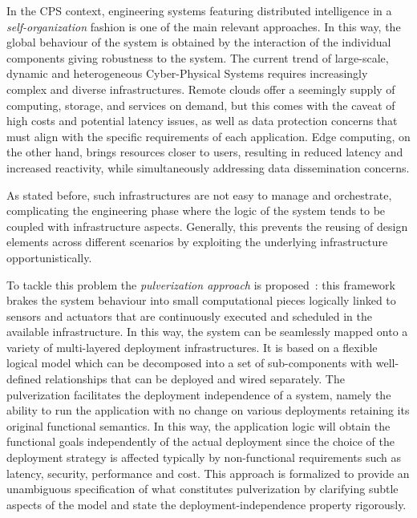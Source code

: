 In the CPS context, engineering systems featuring distributed intelligence in a \emph{self-organization} fashion is one of the main relevant
approaches. In this way, the global behaviour of the system is obtained by the interaction of the individual components giving robustness to the
system. The current trend of large-scale, dynamic and heterogeneous Cyber-Physical Systems requires increasingly complex and diverse
infrastructures. Remote clouds offer a seemingly supply of computing, storage, and services on demand, but this comes with the caveat of high
costs and potential latency issues, as well as data protection concerns that must align with the specific requirements of each application. Edge
computing, on the other hand, brings resources closer to users, resulting in reduced latency and increased reactivity, while simultaneously
addressing data dissemination concerns.

As stated before, such infrastructures are not easy to manage and orchestrate, complicating the engineering phase where the logic of the
system tends to be coupled with infrastructure aspects. Generally, this prevents the reusing of design elements across different scenarios by
exploiting the underlying infrastructure opportunistically.

To tackle this problem the \emph{pulverization approach} is proposed~\cite{fi12110203}: this framework brakes the system behaviour into small
computational pieces logically linked to sensors and actuators that are continuously executed and scheduled in the available infrastructure.
In this way, the system can be seamlessly mapped onto a variety of multi-layered deployment infrastructures.
It is based on a flexible logical model which can be decomposed into a set of sub-components with well-defined relationships that can be deployed and 
wired separately. The pulverization facilitates the deployment independence of a system, namely the ability to run the application with no change
on various deployments retaining its original functional semantics.
In this way, the application logic will obtain the functional goals independently of the actual deployment since the choice of the deployment 
strategy is affected typically by non-functional requirements such as latency, security, performance and cost.
This approach is formalized to provide an unambiguous specification of what constitutes pulverization by clarifying subtle aspects of the model
and state the deployment-independence property rigorously. 

